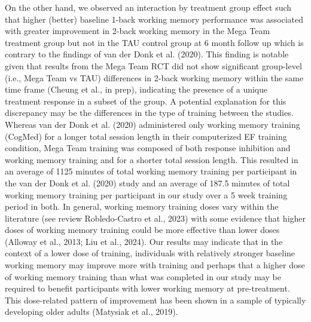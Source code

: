\documentclass[
  letterpaper,
]{ut-thesis}
\begin{document}
On the other hand, we observed an interaction by treatment group effect
such that higher (better) baseline 1-back working memory performance was
associated with greater improvement in 2-back working memory in the Mega
Team treatment group but not in the TAU control group at 6 month follow
up which is contrary to the findings of van der Donk et al. (2020). This
finding is notable given that results from the Mega Team RCT did not
show significant group-level (i.e., Mega Team vs TAU) differences in
2-back working memory within the same time frame (Cheung et al., in
prep), indicating the presence of a unique treatment response in a
subset of the group. A potential explanation for this discrepancy may be
the differences in the type of training between the studies. Whereas van
der Donk et al. (2020) administered only working memory training
(CogMed) for a longer total session length in their computerized EF
training condition, Mega Team training was composed of both response
inhibition and working memory training and for a shorter total session
length. This resulted in an average of 1125 minutes of total working
memory training per participant in the van der Donk et al. (2020) study
and an average of 187.5 minutes of total working memory training per
participant in our study over a 5 week training period in both. In
general, working memory training doses vary within the literature (see
review Robledo-Castro et al., 2023) with some evidence that higher doses
of working memory training could be more effective than lower doses
(Alloway et al., 2013; Liu et al., 2024). Our results may indicate that
in the context of a lower dose of training, individuals with relatively
stronger baseline working memory may improve more with training and
perhaps that a higher dose of working memory training than what was
completed in our study may be required to benefit participants with
lower working memory at pre-treatment. This dose-related pattern of
improvement has been shown in a sample of typically developing older
adults (Matysiak et al., 2019).
\end{document}
